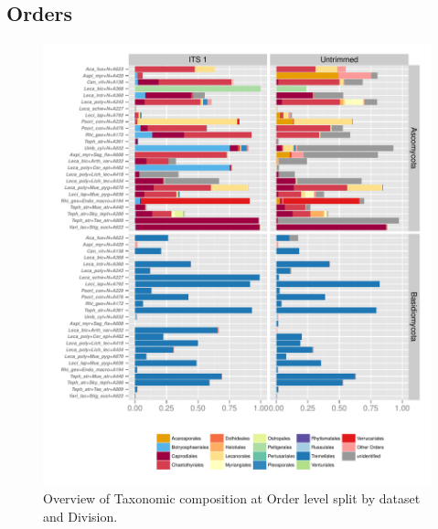\documentclass[a4paper, 11]{article}\usepackage[]{graphicx}\usepackage[]{color}
\makeatletter
\def\maxwidth{ %
  \ifdim\Gin@nat@width>\linewidth
    \linewidth
  \else
    \Gin@nat@width
  \fi
}
\newenvironment{knitrout}{}{} %
\makeatother
\begin{document}
%
%
%
\newpage
\subsection{Orders}
\begin{knitrout}
\color{fgcolor}\begin{figure}[H]
\includegraphics[width=\maxwidth]{figure/10_PlotOrders-1} \caption[Overview of Taxonomic composition at Order level split by dataset and Division]{Overview of Taxonomic composition at Order level split by dataset and Division.}\label{fig:10_PlotOrders}
\end{figure}


\end{knitrout}
\end{document}
